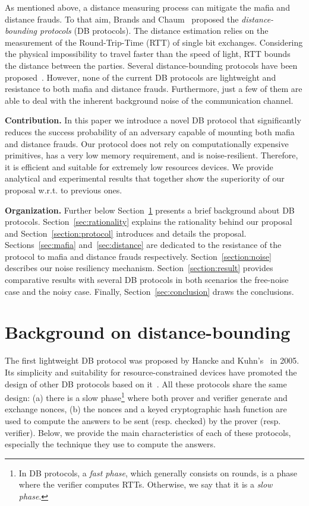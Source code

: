 \documentclass{llncs}
\begin{document}
As mentioned above, a distance measuring process can mitigate the mafia and distance frauds. To that aim, Brands and Chaum~\cite{Brands:1994:DP:188307.188361} proposed the \emph{distance-bounding protocols} (DB protocols). The distance estimation relies on the measurement of the Round-Trip-Time (RTT) of single bit exchanges. Considering the physical impossibility to travel faster than the speed of light, RTT bounds the distance between the parties. Several distance-bounding protocols have been proposed~\cite{AvoineBKLM-2011-jcs}. However, none of the current DB protocols are lightweight and resistance to both mafia and distance frauds. Furthermore, just a few of them are able
to deal with the inherent background noise of the communication
channel. 




\noindent\textbf{Contribution.} In this paper we introduce a novel DB protocol that significantly reduces the success probability of an adversary capable of mounting both mafia and distance frauds. Our protocol does not rely on computationally expensive primitives, has a very low memory requirement, and is noise-resilient. Therefore, it is efficient and suitable for extremely low resources devices. We provide analytical and experimental results that together show the superiority of our proposal w.r.t. to previous ones. 


\noindent\textbf{Organization.} Further below Section~\ref{section:review} presents a brief background about DB protocols. Section~\ref{sec:rationality} explains the rationality behind our proposal and Section~\ref{section:protocol} introduces and details the proposal. Sections~\ref{sec:mafia} and~\ref{sec:distance} are dedicated to the resistance of the protocol to mafia and distance frauds respectively. Section~\ref{section:noise} describes our noise resiliency mechanism. Section~\ref{section:result} provides comparative results with several DB protocols in both scenarios the free-noise case and the noisy case. Finally, Section~\ref{sec:conclusion} draws the conclusions.


\section{Background on distance-bounding}\label{section:review}

The first lightweight DB protocol was proposed by Hancke and Kuhn's~\cite{Hancke:2005:RDB:1128018.1128472} in 2005. Its simplicity and suitability for resource-constrained devices have promoted the design of other DB protocols based on it~\cite{AvoineT-2009-isc,KimA-2011-ieeetwc,Trujillo-Rasua:2010:PDP:1926325.1926352}. All these protocols share the same design: (a) there is a slow phase\footnote{In DB protocols, a \emph{fast phase}, which generally consists on  rounds, is a phase where the verifier computes RTTs. Otherwise, we say that it is a \emph{slow phase}.} where both prover and verifier generate and exchange nonces, (b) the nonces and a keyed cryptographic hash function are used to compute the answers to be sent (resp. checked) by the prover (resp. verifier). Below, we provide the main characteristics of each of these protocols, especially the technique they use to compute the answers. 
\end{document}
